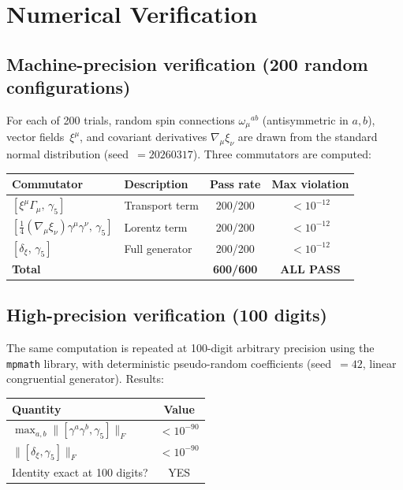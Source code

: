\documentclass[11pt,a4paper]{article}
\begin{document}
\section{Numerical Verification}
\label{sec:numerical}

\subsection{Machine-precision verification (200 random configurations)}
\label{subsec:double}

For each of 200 trials, random spin connections
$\omega_\mu{}^{ab}$ (antisymmetric in $a,b$), vector fields~$\xi^\mu$,
and covariant derivatives $\nabla_\mu\xi_\nu$ are drawn from the
standard normal distribution (seed~$= 20260317$).  Three commutators
are computed:

\begin{center}
\begin{tabular}{llcc}
\toprule
Commutator & Description & Pass rate & Max violation \\
\midrule
$[\xi^\mu\Gamma_\mu,\,\gamma_5]$ & Transport term & 200/200 & $< 10^{-12}$ \\
$[\tfrac{1}{4}(\nabla_\mu\xi_\nu)\gamma^\mu\gamma^\nu,\,\gamma_5]$
  & Lorentz term & 200/200 & $< 10^{-12}$ \\
$[\delta_\xi,\,\gamma_5]$ & Full generator & 200/200 & $< 10^{-12}$ \\
\midrule
\textbf{Total} & & \textbf{600/600} & \textcolor{proven}{\textbf{ALL PASS}} \\
\bottomrule
\end{tabular}
\end{center}

\subsection{High-precision verification (100 digits)}
\label{subsec:mpmath}

The same computation is repeated at 100-digit arbitrary precision
using the \texttt{mpmath} library, with deterministic pseudo-random
coefficients (seed~$= 42$, linear congruential generator).  Results:

\begin{center}
\begin{tabular}{lc}
\toprule
Quantity & Value \\
\midrule
$\max_{a,b}\|[\gamma^a\gamma^b, \gamma_5]\|_F$ & $< 10^{-90}$ \\
$\|[\delta_\xi, \gamma_5]\|_F$ & $< 10^{-90}$ \\
Identity exact at 100 digits? & \textcolor{proven}{YES} \\
\bottomrule
\end{tabular}
\end{center}
\end{document}
